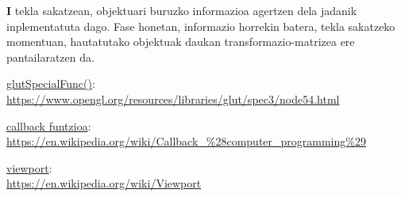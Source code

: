 \documentclass[12pt]{article}
\newcommand{\tekla}[1] {\textbf{#1}}
\begin{document}
\tekla{I} tekla sakatzean, objektuari buruzko informazioa agertzen dela jadanik inplementatuta dago. Fase honetan, informazio horrekin batera, tekla sakatzeko momentuan, hautatutako objektuak daukan transformazio-matrizea ere pantailaratzen da.





\begin{thebibliography}{9}

\underline{glutSpecialFunc()}:\\
\url{https://www.opengl.org/resources/libraries/glut/spec3/node54.html}

\underline{callback funtzioa}:\\
\url{https://en.wikipedia.org/wiki/Callback_%28computer_programming%29}

\underline{viewport}:\\
\url{https://en.wikipedia.org/wiki/Viewport}

\end{thebibliography}
\end{document}
